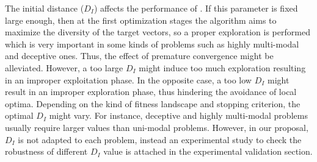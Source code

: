 The initial distance ($D_I$) affects the performance of \DEEDM{}.
%
If this parameter is fixed large enough, then at the first optimization stages the algorithm aims to maximize the diversity 
of the target vectors, 
so a proper exploration is performed which is very important in some kinds of problems such as highly multi-modal and deceptive ones.
%
Thus, the effect of premature convergence might be alleviated.
%
However, a too large $D_I$ might induce too much exploration resulting in an improper exploitation phase.
%
In the opposite case, a too low $D_I$ might result in an improper exploration phase, thus hindering the avoidance of local optima.
%
Depending on the kind of fitness landscape and stopping criterion, the optimal $D_I$ might vary.
%
For instance, deceptive and highly multi-modal problems usually require larger values than uni-modal problems.
%
However, in our proposal, $D_I$ is not adapted to each problem, instead an experimental study to check the robustness
of different $D_I$ value is attached in the experimental validation section. 
%
%
%
%
%
%
%
%

